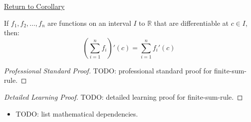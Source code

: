 \newpage
{}
\label{prf:finite-sum-rule}

\begin{remark*}[Return]
\hyperref[cor:finite-sum-rule]{Return to Corollary}
\end{remark*}

\begin{corollary*}
If $f_1, f_2, \dots, f_n$ are functions on an interval $I$ to $\mathbb{R}$ that are differentiable at $c \in I$, then:
\[ \left( \sum_{i=1}^{n} f_i \right)'(c) = \sum_{i=1}^{n} f_i'(c) \]
\end{corollary*}

\begin{proof}[Professional Standard Proof]
\LRAProofBodyStart
TODO: professional standard proof for finite-sum-rule.
\end{proof}

\begin{proof}[Detailed Learning Proof]
\LRAProofBodyStart
TODO: detailed learning proof for finite-sum-rule.
\end{proof}

\begin{remark*}
\end{remark*}

\begin{dependencies}
\begin{itemize}
  \item TODO: list mathematical dependencies.
\end{itemize}
\end{dependencies}

\clearpage
